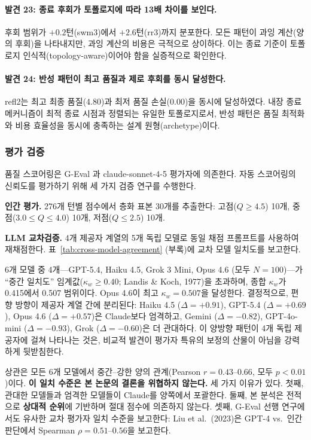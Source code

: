 \documentclass[a4paper,11pt]{article}
\begin{document}
\paragraph{발견 23: 종료 후회가 토폴로지에 따라 13배 차이를 보인다.}
후회 범위가 $+0.2$턴(swm3)에서 $+2.6$턴(rr3)까지 분포한다. 모든 패턴이 과잉 계산(양의 후회)을 나타내지만, 과잉 계산의 비용은 극적으로 상이하다. 이는 종료 기준이 토폴로지 인식적(topology-aware)이어야 함을 실증적으로 확인한다.

\paragraph{발견 24: 반성 패턴이 최고 품질과 제로 후회를 동시 달성한다.}
refl2는 최고 최종 품질(4.80)과 최저 품질 손실(0.00)을 동시에 달성하였다. 내장 종료 메커니즘이 최적 종료 시점과 정렬되는 유일한 토폴로지로서, 반성 패턴은 품질 최적화와 비용 효율성을 동시에 충족하는 설계 원형(archetype)이다.

\subsubsection{평가 검증}

품질 스코어링은 G-Eval \citep{liu2023geval}과 claude-sonnet-4-5 평가자에 의존한다. 자동 스코어링의 신뢰도를 평가하기 위해 세 가지 검증 연구를 수행한다.

\textbf{인간 평가.} 276개 턴별 점수에서 층화 표본 30개를 추출한다: 고점($Q \geq 4.5$) 10개, 중점($3.0 \leq Q \leq 4.0$) 10개, 저점($Q \leq 2.5$) 10개.

\textbf{LLM 교차검증.} 4개 제공자 계열의 5개 독립 모델로 동일 채점 프롬프트를 사용하여 재채점한다. 표~\ref{tab:cross-model-agreement} (부록)에 교차 모델 일치도를 보고한다.


6개 모델 중 4개---GPT-5.4, Haiku 4.5, Grok 3 Mini, Opus 4.6 (모두 $N=100$)---가 ``중간 일치도'' 임계값($\kappa_w \geq 0.40$; Landis \& Koch, 1977)을 초과하며, 종합 $\kappa_w$가 0.415에서 0.507 범위이다. Opus 4.6이 최고 $\kappa_w=0.507$을 달성한다. 결정적으로, 편향 방향이 제공자 계열 간에 분리된다: Haiku 4.5 ($\Delta = +0.91$), GPT-5.4 ($\Delta = +0.69$), Opus 4.6 ($\Delta = +0.57$)은 Claude보다 엄격하고, Gemini ($\Delta = -0.82$), GPT-4o-mini ($\Delta = -0.93$), Grok ($\Delta = -0.60$)은 더 관대하다. 이 양방향 패턴이 4개 독립 제공자에 걸쳐 나타나는 것은, 비교적 발견이 평가자 특유의 보정의 산물이 아님을 강력하게 뒷받침한다.

상관은 모든 6개 모델에서 중간--강한 양의 관계(Pearson $r = 0.43$--$0.66$, 모두 $p < 0.01$)이다. \textbf{이 일치 수준은 본 논문의 결론을 위협하지 않는다.} 세 가지 이유가 있다. 첫째, 관대한 모델들과 엄격한 모델들이 Claude를 양쪽에서 포괄한다. 둘째, 본 분석은 전적으로 \textbf{상대적 순위}에 기반하며 절대 점수에 의존하지 않는다. 셋째, G-Eval 선행 연구에서도 유사한 교차 평가자 일치 수준을 보고한다: Liu et al.\ (2023)은 GPT-4 vs.\ 인간 판단에서 Spearman $\rho = 0.51$--$0.56$을 보고한다.
\end{document}

